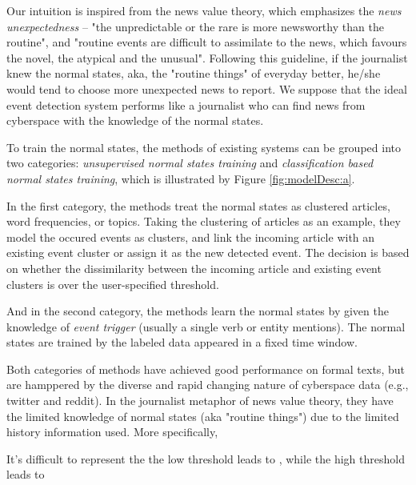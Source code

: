 \documentclass[conference,compsoc]{IEEEtran}
\begin{document}
Our intuition is inspired from the news value theory\cite{galtung1965structure}\cite{caple2013delving}, which emphasizes the \textit{news unexpectedness} -- "the unpredictable or the rare is more newsworthy than the routine"\cite{bell1991language}, and "routine events are difficult to assimilate to the news, which favours the novel, the atypical and the unusual"\cite{montgomery2007discourse}.
Following this guideline, if the journalist knew the normal states, aka, the "routine things" of everyday better, he/she would tend to choose more unexpected news to report. 
We suppose that the ideal event detection system performs like a journalist who can find news from cyberspace with the knowledge of the normal states. 

To train the normal states, the methods of existing systems can be grouped into two categories: \textit{unsupervised normal states training} and \textit{classification based normal states training}, which is illustrated by Figure \ref{fig:modelDesc:a}.

In the first category, the methods treat the normal states as clustered articles\cite{Petrovic:2010uj}\cite{Wurzer:2015wq}, word frequencies\cite{Mathioudakis:2010fc}\cite{Weng:2011wz}, or topics\cite{Diao:2012wj}\cite{Yan:2015wm}. 
Taking the clustering of articles\cite{Petrovic:2010uj}\cite{Wurzer:2015wq} as an example, they model the occured events as clusters, and link the incoming article with an existing event cluster or assign it as the new detected event.
The decision is based on whether the dissimilarity between the incoming article and existing event clusters is over the user-specified threshold. 

And in the second category, the methods learn the normal states by given the knowledge of \textit{event trigger}\cite{Li2013JointEE}\cite{Nguyen2015EventDA} (usually a single verb or entity mentions). The normal states are trained by the labeled data appeared in a fixed time window.

Both categories of methods have achieved good performance on formal texts, but are hamppered by the diverse and rapid changing nature of cyberspace data (e.g., twitter\cite{Asur:2011tc} and reddit\cite{singer2014evolution}).
In the journalist metaphor of news value theory, they have the limited knowledge of normal states (aka "routine things") due to the limited history information used. 
More specifically, 


It's difficult to represent the 
the low threshold leads to , while the high threshold leads to 
\end{document}
